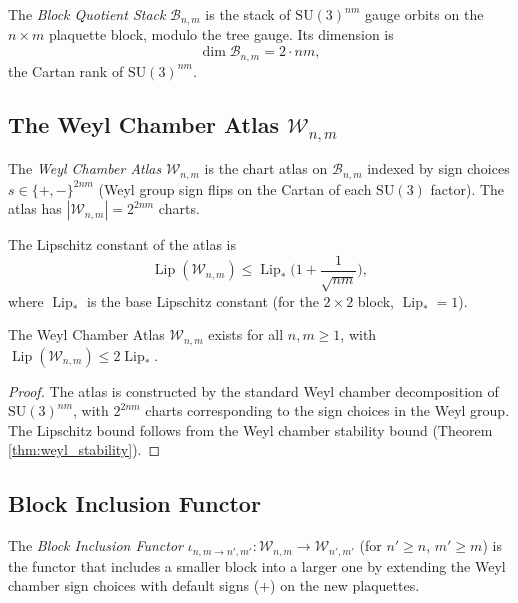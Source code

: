 \begin{definition}
\label{def:bqs}
The \emph{Block Quotient Stack} $\mathcal{B}_{n,m}$ is the stack of
$\mathrm{SU}(3)^{nm}$ gauge orbits on the $n\times m$ plaquette block,
modulo the tree gauge. Its dimension is
\[
\dim\mathcal{B}_{n,m}=2\cdot nm,
\]
the Cartan rank of $\mathrm{SU}(3)^{nm}$.
\end{definition}

\subsection{The Weyl Chamber Atlas $\mathcal{W}_{n,m}$}
\label{ssec:wca}

\begin{definition}
\label{def:wca}
The \emph{Weyl Chamber Atlas} $\mathcal{W}_{n,m}$ is the chart atlas
on $\mathcal{B}_{n,m}$ indexed by sign choices
$s\in\{+,-\}^{2nm}$ (Weyl group sign flips on the Cartan of each
$\mathrm{SU}(3)$ factor). The atlas has
$|\mathcal{W}_{n,m}|=2^{2nm}$ charts.

The Lipschitz constant of the atlas is
\[
\operatorname{Lip}(\mathcal{W}_{n,m})\le\operatorname{Lip}_{*}\Big(1+\frac{1}{\sqrt{nm}}\Big),
\]
where $\operatorname{Lip}_{*}$ is the base Lipschitz constant (for
the $2\times 2$ block, $\operatorname{Lip}_{*}=1$).
\end{definition}

\begin{theorem}
\label{thm:atlas_existence}
The Weyl Chamber Atlas $\mathcal{W}_{n,m}$ exists for all $n,m\ge 1$,
with $\operatorname{Lip}(\mathcal{W}_{n,m})\le 2\operatorname{Lip}_{*}$.
\end{theorem}

\begin{proof}
The atlas is constructed by the standard Weyl chamber decomposition
of $\mathrm{SU}(3)^{nm}$, with $2^{2nm}$ charts corresponding to the
sign choices in the Weyl group. The Lipschitz bound follows from the
Weyl chamber stability bound (Theorem \ref{thm:weyl_stability}).
\end{proof}

\subsection{Block Inclusion Functor}
\label{ssec:bif}

\begin{definition}
\label{def:bif}
The \emph{Block Inclusion Functor}
$\iota_{n,m\to n',m'}:\mathcal{W}_{n,m}\to\mathcal{W}_{n',m'}$ (for
$n'\ge n$, $m'\ge m$) is the functor that includes a smaller block
into a larger one by extending the Weyl chamber sign choices with
default signs ($+$) on the new plaquettes.
\end{definition}

